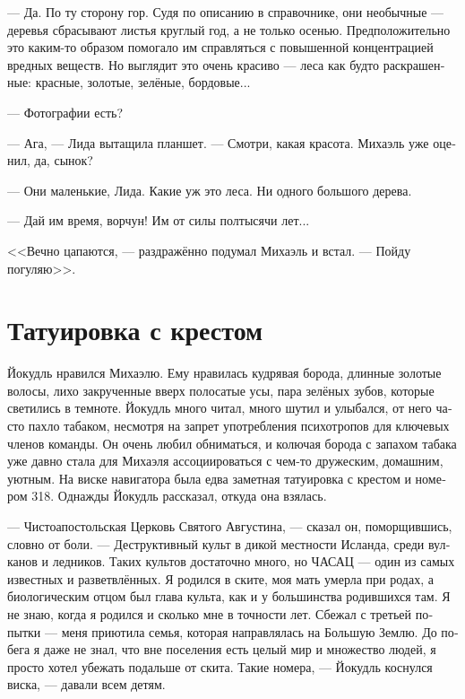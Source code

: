 \documentclass[a4paper,12pt,fleqn]{book}\usepackage{polyglossia}\setdefaultlanguage[babelshorthands=true]{russian}\setotherlanguage{english}\defaultfontfeatures{Ligatures=TeX,Mapping=tex-text}\usepackage{xcolor}\newcommand{\ml}[3]{#2}
\begin{document}
--- Да.
По ту сторону гор.
Судя по описанию в справочнике, они необычные --- деревья сбрасывают листья круглый год, а не только осенью.
Предположительно это каким-то образом помогало им справляться с повышенной концентрацией вредных веществ.
Но выглядит это очень красиво --- леса как будто раскрашенные: красные, золотые, зелёные, бордовые...

--- Фотографии есть?

--- Ага, --- Лида вытащила планшет.
--- Смотри, какая красота.
Михаэль уже оценил, да, сынок?

--- Они маленькие, Лида.
Какие уж это леса.
Ни одного большого дерева.

--- Дай им время, ворчун!
Им от силы полтысячи лет...

<<Вечно цапаются, --- раздражённо подумал Михаэль и встал.
--- Пойду погуляю>>.

\section{Татуировка с крестом}

Йокудль нравился Михаэлю.
Ему нравилась кудрявая борода, длинные золотые волосы, лихо закрученные вверх полосатые усы, пара зелёных зубов, которые светились в темноте.
Йокудль много читал, много шутил и улыбался, от него часто пахло табаком, несмотря на запрет употребления психотропов для ключевых членов команды.
Он очень любил обниматься, и колючая борода с запахом табака уже давно стала для Михаэля ассоциироваться с чем-то дружеским, домашним, уютным.
На виске навигатора была едва заметная татуировка с крестом и номером 318.
Однажды Йокудль рассказал, откуда она взялась.

\ml{$0$}
{--- Чистоапостольская Церковь Святого Августина, --- сказал он, поморщившись, словно от боли.}
{``Pure Apostolic Saint Augustine Church,'' he said, like he was feeling pain.}
\ml{$0$}
{--- Деструктивный культ в дикой местности Исланда, среди вулканов и ледников.}
{``A destructive cult from Island wilderness, among volcanos and glaciers.}
\ml{$0$}
{Таких культов достаточно много, но ЧАСАЦ --- один из самых известных и разветвлённых.}
{There are many cults like those, but PASAC is one of the most famous and most branched.}
\ml{$0$}
{Я родился в ските, моя мать умерла при родах, а биологическим отцом был глава культа, как и у большинства родившихся там.}
{I was born in a skete, my mother died in childbirth, and a cult patriarch was my father and a father of most children there.}
\ml{$0$}
{Я не знаю, когда я родился и сколько мне в точности лет.}
{I don't know my date of birth, even how old exactly I am.}
\ml{$0$}
{Сбежал с третьей попытки --- меня приютила семья, которая направлялась на Большую Землю.}
{It took me three attempts to escape, the family which took me in was en route to the Mainland.}
\ml{$0$}
{До побега я даже не знал, что вне поселения есть целый мир и множество людей, я просто хотел убежать подальше от скита.}
{Before I succeed, I haven't had any idea how big the world is or how many people there live, I just wanted to run far-far away from the skete.}
Такие номера, --- Йокудль коснулся виска, --- давали всем детям.
\end{document}
